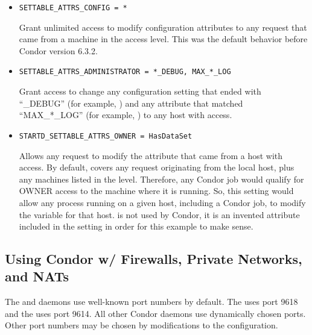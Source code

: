 \begin{itemize}

\item \begin{verbatim}SETTABLE_ATTRS_CONFIG = *\end{verbatim}
Grant unlimited access to modify configuration attributes
to any request that came from a machine in the  access
level. 
This was the default behavior before Condor version 6.3.2.

\item \begin{verbatim}SETTABLE_ATTRS_ADMINISTRATOR = *_DEBUG, MAX_*_LOG\end{verbatim} 
Grant access to change any configuration setting that ended
with ``\_DEBUG'' (for example, ) and any
attribute that matched ``MAX\_*\_LOG'' (for example,
) to any host with 
access. 

\item \begin{verbatim}STARTD_SETTABLE_ATTRS_OWNER = HasDataSet\end{verbatim}
Allows any request to modify the  
attribute that came from a host with  access.
By default,  covers any request originating from the
local host, plus any machines listed in the 
level.
Therefore, any Condor job would qualify for OWNER access to the
machine where it is running. 
So, this setting would allow any process running on a given host,
including a Condor job, to modify the  variable for
that host. 
 is not used by Condor, it is an invented attribute
included in the  setting in order for this
example to make sense.

\end{itemize}


\subsection{\label{sec:security-networks}Using 
Condor w/ Firewalls, Private Networks, and NATs}


The  and  daemons
use well-known port numbers by default.
The  uses port 9618
and the  uses port 9614.
All other Condor daemons use dynamically chosen ports.
Other port numbers may be chosen by modifications to
the configuration.

